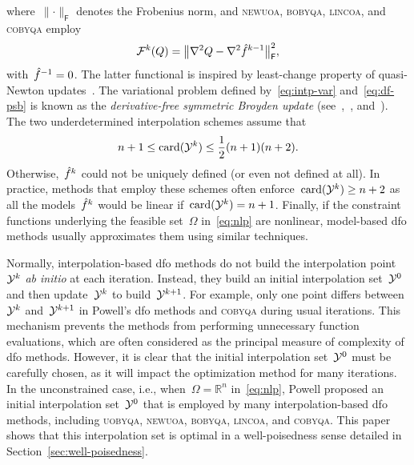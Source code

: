 \documentclass[draft]{article}
\numberwithin{equation}{section}
\theoremstyle{definition}
\DeclareMathOperator{\card}{card}
\newcommand{\fset}{\Omega}
\newcommand{\norm}[2][]{#1\lVert#2#1\rVert}
\newcommand{\obj}{f}
\newcommand{\objm}[1][]{\hat{\obj}\ifblank{#1}{}{^{#1}}}
\newcommand{\R}{\mathbb{R}}
\newcommand{\solvername}[1]{\textsc{#1}\xspace}
\newcommand{\xpt}[1][]{\mathcal{Y}\ifblank{#1}{}{^{#1}}}
\begin{document}
where~$\norm{\cdot}_{\mathsf{F}}$ denotes the Frobenius norm, and \solvername{newuoa}, \solvername{bobyqa}, \solvername{lincoa}, and \solvername{cobyqa} employ
\begin{equation}
    \label{eq:df-psb}
    \mathcal{F}^k(Q) = \norm[\big]{\nabla^2 Q - \nabla^2 \objm[k - 1]}_{\mathsf{F}}^2,
\end{equation}
with~$\objm[-1] = 0$.
The latter functional is inspired by least-change property of quasi-Newton updates~\cite{Dennis_Schnabel_1979}.
The variational problem defined by~\eqref{eq:intp-var} and~\eqref{eq:df-psb} is known as the \emph{derivative-free symmetric Broyden update} (see~\cite{Powell_2013},~\cite[\S~3.6]{Zhang_2012}, and~\cite[\S~2.4.2]{Ragonneau_2022}).
The two underdetermined interpolation schemes assume that
\begin{equation*}
    n + 1 \le \card(\xpt[k]) \le \frac{1}{2} (n + 1) (n + 2).
\end{equation*}
Otherwise,~$\objm[k]$ could not be uniquely defined (or even not defined at all).
In practice, methods that employ these schemes often enforce~$\card(\xpt[k]) \ge n + 2$ as all the models~$\objm[k]$ would be linear if~$\card(\xpt[k]) = n + 1$.
Finally, if the constraint functions underlying the feasible set~$\fset$ in~\eqref{eq:nlp} are nonlinear, model-based \gls{dfo} methods usually approximates them using similar techniques.

Normally, interpolation-based \gls{dfo} methods do not build the interpolation point~$\xpt[k]$ \emph{ab initio} at each iteration.
Instead, they build an initial interpolation set~$\xpt[0]$ and then  update~$\xpt[k]$ to build~$\xpt[k + 1]$.
For example, only one point differs between~$\xpt[k]$ and~$\xpt[k + 1]$ in Powell's \gls{dfo} methods and \solvername{cobyqa} during usual iterations.
This mechanism prevents the methods from performing unnecessary function evaluations, which are often considered as the principal measure of complexity of \gls{dfo} methods.
However, it is clear that the initial interpolation set~$\xpt[0]$ must be carefully chosen, as it will impact the optimization method for many iterations.
In the unconstrained case, i.e., when~$\fset = \R^n$ in~\eqref{eq:nlp}, Powell proposed an initial interpolation set~$\xpt[0]$ that is employed by many interpolation-based \gls{dfo} methods, including \solvername{uobyqa}, \solvername{newuoa}, \solvername{bobyqa}, \solvername{lincoa}, and \solvername{cobyqa}.
This paper shows that this interpolation set is optimal in a well-poisedness sense detailed in Section~\ref{sec:well-poisedness}.
\end{document}
